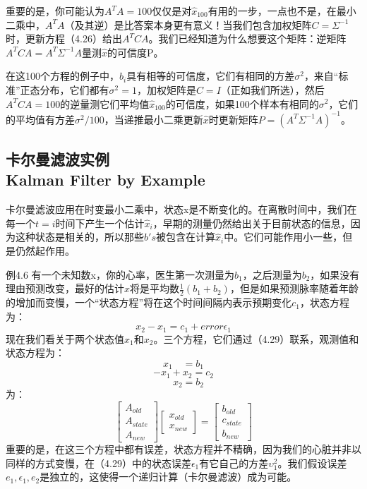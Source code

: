 重要的是，你可能认为$A^TA=100$仅仅是对$\hat{x}_{100}$有用的一步，一点也不是，在最小二乘中，$A^TA$（及其逆）是比答案本身更有意义！当我们包含加权矩阵$C=\Sigma^{-1}$时，更新方程（4.26）给出$A^TCA$。我们已经知道为什么想要这个矩阵：逆矩阵$A^TCA=A^T\Sigma^{-1}A$量测$\hat{x}$的可信度P。

在这100个方程的例子中，$b_i$具有相等的可信度，它们有相同的方差$\sigma^2$，来自“标准”正态分布，它们都有$\sigma^2=1$，加权矩阵是$C=I$（正如我们所选），然后$A^TCA=100$的逆量测它们平均值$\hat{x}_{100}$的可信度，如果100个样本有相同的$\sigma^2$，它们的平均值有方差$\sigma^2/100$，当递推最小二乘更新$\hat{x}$时更新矩阵$P=(A^T\Sigma^{-1}A)^{-1}$。

	\subsection[卡尔曼滤波实例]{卡尔曼滤波实例\\Kalman Filter by Example}
	卡尔曼滤波应用在时变最小二乘中，状态x是不断变化的。在离散时间中，我们在每一个$t=i$时间下产生一个估计$\hat{x}_i$，早期的测量仍然给出关于目前状态的信息，因为这种状态是相关的，所以那些$b's$被包含在计算$\hat{x}_i$中。它们可能作用小一些，但是仍然起作用。
	
	例4.6 \quad  有一个未知数x，你的心率，医生第一次测量为$b_1$，之后测量为$b_2$，如果没有理由预测改变，最好的估计$\hat{x}$将是平均数$\frac{1}{2}(b_1+b_2)$，但是如果预测脉率随着年龄的增加而变慢，一个“状态方程”将在这个时间间隔内表示预期变化$c_1$，状态方程为：
	\begin{equation}
	x_2-x_1=c_1+error\epsilon_1
	\end{equation}
	现在我们看关于两个状态值$x_1$和$x_2$。三个方程，它们通过（4.29）联系，观测值和状态方程为：
	\begin{equation}
	x_1 \quad =b_1 
	\end{equation}
	\begin{equation*}
    -x_1+x_2=c_2 
	\end{equation*}
	\begin{equation*}		
	\quad x_2 = b_2
	\end{equation*}
	为：
	\begin{equation*}
	\begin{bmatrix}
	A_{old} \\ A_{state} \\ A_{new}
	\end{bmatrix}
	\begin{bmatrix}
	x_{old}  \\ x_{new}
	\end{bmatrix}
	=
	\begin{bmatrix}
	b_{old} \\ c_{state} \\ b_{new}
	\end{bmatrix}
	\end{equation*}
	重要的是，在这三个方程中都有误差，状态方程并不精确，因为我们的心脏并非以同样的方式变慢，在（4.29）中的状态误差$\epsilon_1$有它自己的方差$\upsilon^2_1$。我们假设误差$e_1,\epsilon_1,e_2$是独立的，这使得一个递归计算（卡尔曼滤波）成为可能。
	
